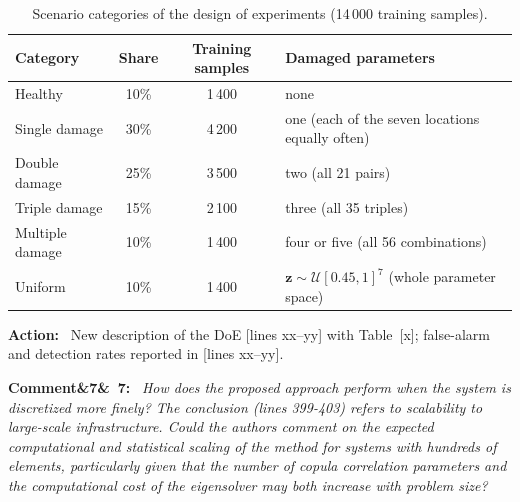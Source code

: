 \documentclass[11pt]{article}
\newenvironment{rcomment}[1]{\par\bigskip\noindent\textbf{Comment\ifx&#1&\else\ #1\fi:}\ \itshape}{\par}
\newenvironment{action}{\par\smallskip\noindent\color{resp}\textbf{Action:}\ }{\par}
\newcommand{\tbd}[1]{\textcolor{note}{\textsf{[#1]}}}
\newcommand{\lines}[1]{\tbd{lines #1}}
\newcommand{\z}{\mathbf{z}}
\begin{document}
\begin{table}[H]
\centering\small
\caption{Scenario categories of the design of experiments (14\,000 training samples).}
\label{tab:doe}
\begin{tabular}{lccl}
\toprule
Category & Share & Training samples & Damaged parameters \\
\midrule
Healthy & 10\% & 1\,400 & none \\
Single damage & 30\% & 4\,200 & one (each of the seven locations equally often) \\
Double damage & 25\% & 3\,500 & two (all 21 pairs) \\
Triple damage & 15\% & 2\,100 & three (all 35 triples) \\
Multiple damage & 10\% & 1\,400 & four or five (all 56 combinations) \\
Uniform & 10\% & 1\,400 & $\z\sim\mathcal{U}[0.45,1]^7$ (whole parameter space) \\
\bottomrule
\end{tabular}
\end{table}

\begin{action}
New description of the DoE \lines{xx--yy} with Table~\tbd{x}; false-alarm and detection rates reported in
\lines{xx--yy}.
\end{action}

\begin{rcomment}{7}
How does the proposed approach perform when the system is discretized more finely? The conclusion (lines 399-403)
refers to scalability to large-scale infrastructure. Could the authors comment on the expected computational and
statistical scaling of the method for systems with hundreds of elements, particularly given that the number of copula
correlation parameters and the computational cost of the eigensolver may both increase with problem size?
\end{rcomment}
\end{document}
